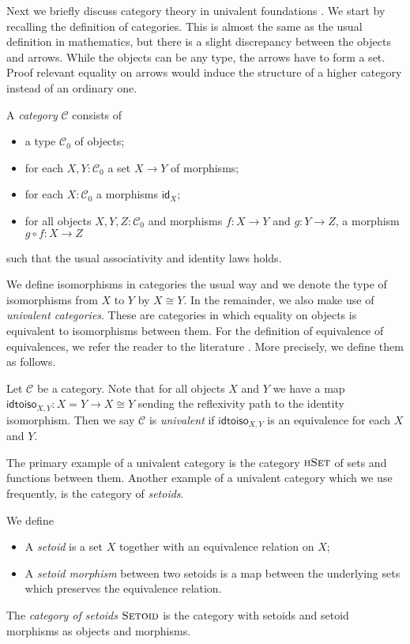 \documentclass[9pt]{entcs}
\newcommand{\type}[1]{\textsc{#1}}
\newcommand{\category}[1]{\textsc{#1}}
\newcommand{\function}[1]{\mathsf{#1}}
\newcommand{\morphism}[1]{\mathsf{#1}}
\newcommand{\hset}{\type{hSet}} %
\newcommand{\0}{\textbf{0}} %
\newcommand{\idm}[1]{\morphism{id}_{#1}} %
\newcommand{\compm}[2]{#2 \circ #1} %
\newcommand{\iso}[2]{#1 \cong #2} %
\newcommand{\setoids}{\category{Setoid}} %
\newcommand{\idtoiso}{\function{idtoiso}} %
\begin{document}
Next we briefly discuss category theory in univalent foundations \cite{AhrensKS15,hottbook}.
We start by recalling the definition of categories.
This is almost the same as the usual definition in mathematics, but there is a slight discrepancy between the objects and arrows.
While the objects can be any type, the arrows have to form a set.
Proof relevant equality on arrows would induce the structure of a higher category instead of an ordinary one.

\begin{definition}
\label{def:cat}
A \emph{category} $\mathcal{C}$ consists of
\begin{itemize}
	\item a type $\mathcal{C}_0$ of objects;
	\item for each $X, Y : \mathcal{C}_0$ a set $X \rightarrow Y$ of morphisms;
	\item for each $X : \mathcal{C}_0$ a morphisms $\idm{X}$;
	\item for all objects $X, Y, Z : \mathcal{C}_0$ and morphisms $f : X \rightarrow Y$ and $g : Y \rightarrow Z$, a morphism $\compm{f}{g} : X \rightarrow Z$
\end{itemize}
such that the usual associativity and identity laws holds.
\end{definition}

We define isomorphisms in categories the usual way and we denote the type of isomorphisms from $X$ to $Y$ by $\iso{X}{Y}$.
In the remainder, we also make use of \emph{univalent categories}.
These are categories in which equality on objects is equivalent to isomorphisms between them.
For the definition of equivalence of equivalences, we refer the reader to the literature \cite{hottbook}.
More precisely, we define them as follows.

\begin{definition}
\label{def:univalent}
Let $\mathcal{C}$ be a category.
Note that for all objects $X$ and $Y$ we have a map $\idtoiso_{X,Y} : X = Y \rightarrow \iso{X}{Y}$ sending the reflexivity path to the identity isomorphism.
Then we say $\mathcal{C}$ is \emph{univalent} if $\idtoiso_{X,Y}$ is an equivalence for each $X$ and $Y$.
\end{definition}

The primary example of a univalent category is the category $\hset$ of sets and functions between them.
Another example of a univalent category which we use frequently, is the category of \emph{setoids}.

\begin{definition}
\label{def:setoid}
We define
\begin{itemize}
	\item A \emph{setoid} is a set $X$ together with an equivalence relation on $X$;
	\item A \emph{setoid morphism} between two setoids  is a map between the underlying sets which preserves the equivalence relation.
\end{itemize}
The \emph{category of setoids} $\setoids$ is the category with setoids and setoid morphisms as objects and morphisms.
\end{definition}
\end{document}
